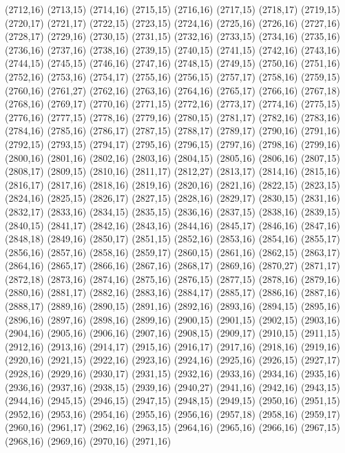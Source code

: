 (2712,16)
(2713,15)
(2714,16)
(2715,15)
(2716,16)
(2717,15)
(2718,17)
(2719,15)
(2720,17)
(2721,17)
(2722,15)
(2723,15)
(2724,16)
(2725,16)
(2726,16)
(2727,16)
(2728,17)
(2729,16)
(2730,15)
(2731,15)
(2732,16)
(2733,15)
(2734,16)
(2735,16)
(2736,16)
(2737,16)
(2738,16)
(2739,15)
(2740,15)
(2741,15)
(2742,16)
(2743,16)
(2744,15)
(2745,15)
(2746,16)
(2747,16)
(2748,15)
(2749,15)
(2750,16)
(2751,16)
(2752,16)
(2753,16)
(2754,17)
(2755,16)
(2756,15)
(2757,17)
(2758,16)
(2759,15)
(2760,16)
(2761,27)
(2762,16)
(2763,16)
(2764,16)
(2765,17)
(2766,16)
(2767,18)
(2768,16)
(2769,17)
(2770,16)
(2771,15)
(2772,16)
(2773,17)
(2774,16)
(2775,15)
(2776,16)
(2777,15)
(2778,16)
(2779,16)
(2780,15)
(2781,17)
(2782,16)
(2783,16)
(2784,16)
(2785,16)
(2786,17)
(2787,15)
(2788,17)
(2789,17)
(2790,16)
(2791,16)
(2792,15)
(2793,15)
(2794,17)
(2795,16)
(2796,15)
(2797,16)
(2798,16)
(2799,16)
(2800,16)
(2801,16)
(2802,16)
(2803,16)
(2804,15)
(2805,16)
(2806,16)
(2807,15)
(2808,17)
(2809,15)
(2810,16)
(2811,17)
(2812,27)
(2813,17)
(2814,16)
(2815,16)
(2816,17)
(2817,16)
(2818,16)
(2819,16)
(2820,16)
(2821,16)
(2822,15)
(2823,15)
(2824,16)
(2825,15)
(2826,17)
(2827,15)
(2828,16)
(2829,17)
(2830,15)
(2831,16)
(2832,17)
(2833,16)
(2834,15)
(2835,15)
(2836,16)
(2837,15)
(2838,16)
(2839,15)
(2840,15)
(2841,17)
(2842,16)
(2843,16)
(2844,16)
(2845,17)
(2846,16)
(2847,16)
(2848,18)
(2849,16)
(2850,17)
(2851,15)
(2852,16)
(2853,16)
(2854,16)
(2855,17)
(2856,16)
(2857,16)
(2858,16)
(2859,17)
(2860,15)
(2861,16)
(2862,15)
(2863,17)
(2864,16)
(2865,17)
(2866,16)
(2867,16)
(2868,17)
(2869,16)
(2870,27)
(2871,17)
(2872,18)
(2873,16)
(2874,16)
(2875,16)
(2876,15)
(2877,15)
(2878,16)
(2879,16)
(2880,16)
(2881,17)
(2882,16)
(2883,16)
(2884,17)
(2885,17)
(2886,16)
(2887,16)
(2888,17)
(2889,16)
(2890,15)
(2891,16)
(2892,16)
(2893,16)
(2894,15)
(2895,16)
(2896,16)
(2897,16)
(2898,16)
(2899,16)
(2900,15)
(2901,15)
(2902,15)
(2903,16)
(2904,16)
(2905,16)
(2906,16)
(2907,16)
(2908,15)
(2909,17)
(2910,15)
(2911,15)
(2912,16)
(2913,16)
(2914,17)
(2915,16)
(2916,17)
(2917,16)
(2918,16)
(2919,16)
(2920,16)
(2921,15)
(2922,16)
(2923,16)
(2924,16)
(2925,16)
(2926,15)
(2927,17)
(2928,16)
(2929,16)
(2930,17)
(2931,15)
(2932,16)
(2933,16)
(2934,16)
(2935,16)
(2936,16)
(2937,16)
(2938,15)
(2939,16)
(2940,27)
(2941,16)
(2942,16)
(2943,15)
(2944,16)
(2945,15)
(2946,15)
(2947,15)
(2948,15)
(2949,15)
(2950,16)
(2951,15)
(2952,16)
(2953,16)
(2954,16)
(2955,16)
(2956,16)
(2957,18)
(2958,16)
(2959,17)
(2960,16)
(2961,17)
(2962,16)
(2963,15)
(2964,16)
(2965,16)
(2966,16)
(2967,15)
(2968,16)
(2969,16)
(2970,16)
(2971,16)
